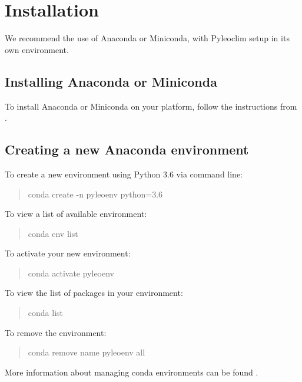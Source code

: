 \documentclass[letterpaper,10pt,english]{sphinxmanual}
\begin{document}
\chapter{Installation}
\label{\detokenize{Installation:installation}}\label{\detokenize{Installation::doc}}
We recommend the use of Anaconda or Miniconda, with Pyleoclim setup in
its own environment.


\section{Installing Anaconda or Miniconda}
\label{\detokenize{Installation:installing-anaconda-or-miniconda}}
To install Anaconda or Miniconda on your platform, follow the instructions from .


\section{Creating a new Anaconda environment}
\label{\detokenize{Installation:creating-a-new-anaconda-environment}}
To create a new environment using Python 3.6 via command line:
\begin{quote}

conda create -n pyleoenv python=3.6
\end{quote}

To view a list of available environment:
\begin{quote}

conda env list
\end{quote}

To activate your new environment:
\begin{quote}

conda activate pyleoenv
\end{quote}

To view the list of packages in your environment:
\begin{quote}

conda list
\end{quote}

To remove the environment:
\begin{quote}

conda remove \textendash{}name pyleoenv \textendash{}all
\end{quote}

More information about managing conda environments can be found .
\end{document}
